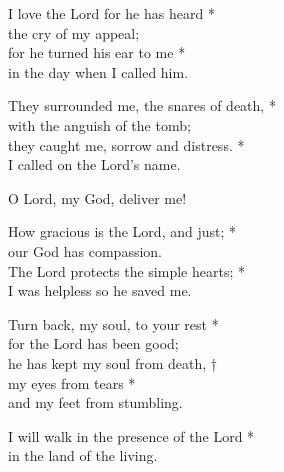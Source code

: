 I love the Lord for he has heard *\\
the cry of my appeal;\\
for he turned his ear to me *\\
in the day when I called him.

They surrounded me, the snares of death, *\\
with the anguish of the tomb;\\
they caught me, sorrow and distress. *\\
I called on the Lord's name.

O Lord, my God, deliver me!

How gracious is the Lord, and just; *\\
our God has compassion.\\
The Lord protects the simple hearts; *\\
I was helpless so he saved me.

Turn back, my soul, to your rest *\\
for the Lord has been good;\\
he has kept my soul from death, †\\
my eyes from tears *\\
and my feet from stumbling.

I will walk in the presence of the Lord *\\
in the land of the living.